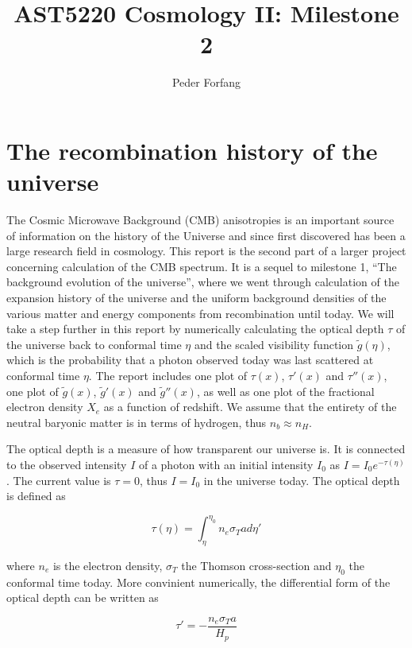 \documentclass[norsk,a4paper,12pt]{article}
\begin{document}
\title{AST5220 Cosmology II: Milestone 2}
\author{Peder Forfang}
\maketitle

\section{The recombination history of the universe}
The Cosmic Microwave Background (CMB) anisotropies is an important source of information on the history of the Universe and since first discovered has been a large research field in cosmology. This report is the second part of a larger project concerning calculation of the CMB spectrum. It is a sequel to milestone 1, ``The background evolution of the universe'', where we went through calculation of the expansion history of the universe and the uniform background densities of the various matter and energy components from recombination until today. We will take a step further in this report by numerically calculating the optical depth $\tau$ of the universe back to conformal time $\eta $ and the scaled visibility function $\tilde{g}(\eta)$, which is the probability that a photon observed today was last scattered at conformal time $\eta$. The report includes one plot of $\tau(x)$, $\tau'(x)$ and $\tau''(x)$, one plot of $\tilde{g}(x)$, $\tilde{g}'(x)$ and $\tilde{g}''(x)$, as well as one plot of the fractional electron density $X_e$ as a function of redshift. We assume that the entirety of the neutral baryonic matter is in terms of hydrogen, thus $n_b \approx n_H$. 

The optical depth is a measure of how transparent our universe is. It is connected to the observed intensity $I$ of a photon with an initial intensity $I_0$ as $I = I_0e^{-\tau(\eta)}$. The current value is $\tau = 0$, thus $I = I_0$ in the universe today. The optical depth is defined as 

\begin{equation}
 \tau(\eta) = \int_{\eta}^{\eta_0} n_e\sigma_T a d\eta'
\end{equation}

where $n_e$ is the electron density, $\sigma_T $ the Thomson cross-section and $\eta_0 $ the conformal time today. More convinient numerically, the differential form of the optical depth can be written as

\begin{equation}
 \tau' = -\frac{n_e \sigma_T a}{H_p}
\end{equation}
\end{document}
